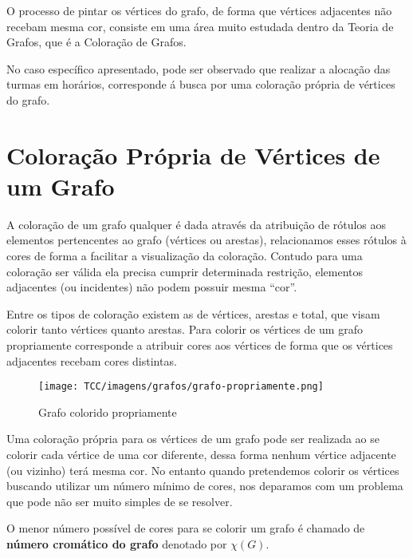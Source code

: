 O processo de pintar os vértices do grafo, de forma que vértices adjacentes não recebam mesma cor, consiste em uma área muito estudada dentro da Teoria de Grafos, que é a Coloração de Grafos.

No caso específico apresentado, pode ser observado que realizar a alocação das turmas em horários, corresponde á busca por uma coloração própria de vértices do grafo.


\section{Coloração Própria de Vértices de um Grafo}




A coloração de um grafo qualquer é dada através da atribuição de rótulos aos elementos pertencentes ao grafo (vértices ou arestas), relacionamos esses rótulos à cores de forma a facilitar a visualização da coloração. Contudo para uma coloração ser válida ela precisa cumprir determinada restrição, elementos adjacentes (ou incidentes) não podem possuir mesma “cor”.


Entre os tipos de coloração existem as de vértices, arestas e total, que visam colorir tanto vértices quanto arestas. Para  colorir os vértices de um grafo propriamente corresponde a atribuir cores aos vértices de forma que os vértices adjacentes recebam cores distintas.


\begin{figure}[H]
     \centering
     \texttt{[image: TCC/imagens/grafos/grafo-propriamente.png]}
     \caption{Grafo colorido propriamente}
     \label{grafo-propriamente}
\end{figure}


Uma coloração própria para os vértices de um grafo pode ser realizada ao se colorir cada vértice de uma cor diferente, dessa forma nenhum vértice adjacente (ou vizinho) terá mesma cor. No entanto quando pretendemos colorir os vértices buscando utilizar um número mínimo de cores, nos deparamos com um problema que pode não ser muito simples de se resolver.

\begin{definition} 
O menor número possível de cores para se colorir um grafo é chamado de \textbf{número cromático do grafo} denotado por $\chi(G)$. 
\end{definition}

